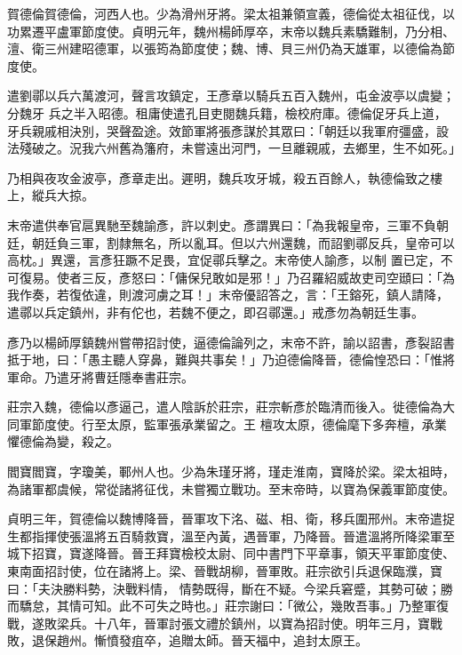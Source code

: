 \begin{pinyinscope}
 賀德倫賀德倫，河西人也。少為滑州牙將。梁太祖兼領宣義，德倫從太祖征伐，以功累遷平盧軍節度使。貞明元年，魏州楊師厚卒，末帝以魏兵素驕難制，乃分相、澶、衛三州建昭德軍，以張筠為節度使；魏、博、貝三州仍為天雄軍，以德倫為節度使。



 遣劉鄩以兵六萬渡河，聲言攻鎮定，王彥章以騎兵五百入魏州，屯金波亭以虞變；分魏牙
 兵之半入昭德。租庸使遣孔目吏閱魏兵籍，檢校府庫。德倫促牙兵上道，牙兵親戚相決別，哭聲盈途。效節軍將張彥謀於其眾曰：「朝廷以我軍府彊盛，設法殘破之。況我六州舊為籓府，未嘗遠出河門，一旦離親戚，去鄉里，生不如死。」



 乃相與夜攻金波亭，彥章走出。遲明，魏兵攻牙城，殺五百餘人，執德倫致之樓上，縱兵大掠。



 末帝遣供奉官扈異馳至魏諭彥，許以刺史。彥謂異曰：「為我報皇帝，三軍不負朝廷，朝廷負三軍，割隸無名，所以亂耳。但以六州還魏，而詔劉鄩反兵，皇帝可以高枕。」異還，言彥狂蹶不足畏，宜促鄩兵擊之。末帝使人諭彥，以制
 置已定，不可復易。使者三反，彥怒曰：「傭保兒敢如是邪！」乃召羅紹威故吏司空頲曰：「為我作奏，若復依違，則渡河虜之耳！」末帝優詔答之，言：「王鎔死，鎮人請降，遣鄩以兵定鎮州，非有佗也，若魏不便之，即召鄩還。」戒彥勿為朝廷生事。



 彥乃以楊師厚鎮魏州嘗帶招討使，逼德倫論列之，末帝不許，諭以詔書，彥裂詔書抵于地，曰：「愚主聽人穿鼻，難與共事矣！」乃迫德倫降晉，德倫惶恐曰：「惟將軍命。乃遣牙將曹廷隱奉書莊宗。



 莊宗入魏，德倫以彥逼己，遣人陰訴於莊宗，莊宗斬彥於臨清而後入。徙德倫為大同軍節度使。行至太原，監軍張承業留之。王
 檀攻太原，德倫麾下多奔檀，承業懼德倫為變，殺之。



 閻寶閻寶，字瓊美，鄆州人也。少為朱瑾牙將，瑾走淮南，寶降於梁。梁太祖時，為諸軍都虞候，常從諸將征伐，未嘗獨立戰功。至末帝時，以寶為保義軍節度使。



 貞明三年，賀德倫以魏博降晉，晉軍攻下洺、磁、相、衛，移兵圍邢州。末帝遣捉生都指揮使張溫將五百騎救寶，溫至內黃，遇晉軍，乃降晉。晉遣溫將所降梁軍至城下招寶，寶遂降晉。晉王拜寶檢校太尉、同中書門下平章事，領天平軍節度使、東南面招討使，位在諸將上。梁、晉戰胡柳，晉軍敗。莊宗欲引兵退保臨濮，寶曰：「夫決勝料勢，決戰料情，
 情勢既得，斷在不疑。今梁兵窘蹙，其勢可破；勝而驕怠，其情可知。此不可失之時也。」莊宗謝曰：「微公，幾敗吾事。」乃整軍復戰，遂敗梁兵。十八年，晉軍討張文禮於鎮州，以寶為招討使。明年三月，寶戰敗，退保趙州。慚憤發疽卒，追贈太師。晉天福中，追封太原王。




\end{pinyinscope}
